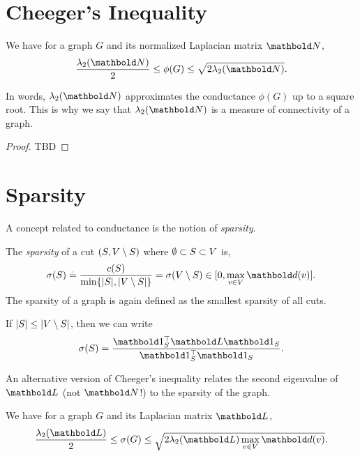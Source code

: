 \section{Cheeger's Inequality}

\begin{thm} We have for a graph $G$ and its normalized Laplacian matrix $\mN$, \begin{align}
    \frac{\lambda_2(\mN)}{2} \leq \phi(G) \leq \sqrt{2 \lambda_2(\mN)}.
\end{align}
\end{thm}\noindent In words, $\lambda_2(\mN)$ approximates the conductance $\phi(G)$ up to a square root. This is why we say that $\lambda_2(\mN)$ is a measure of connectivity of a graph.

\begin{proof}
TBD
\end{proof}

\section{Sparsity}

A concept related to conductance is the notion of \emph{sparsity}.

\begin{defn}[Sparsity] The \emph{sparsity} of a cut $(S, V \setminus S)$ where $\emptyset \subset S \subset V$ is, \begin{align}
    \sigma(\sS) \defeq \frac{c(\sS)}{\min\{|\sS|, |\sV \setminus \sS|\}} = \sigma(\sV \setminus \sS) \in [0, \max_{v \in \sV} \vd(v)].
\end{align} The sparsity of a graph is again defined as the smallest sparsity of all cuts.
\end{defn} If $|S| \leq |V \setminus S|$, then we can write \begin{align}
    \sigma(\sS) = \frac{\trans{\vOne_\sS}\mL\vOne_\sS}{\trans{\vOne_\sS}\vOne_\sS}.
\end{align}

An alternative version of Cheeger's inequality relates the second eigenvalue of $\mL$ (not $\mN$!) to the sparsity of the graph.

\begin{thm} We have for a graph $G$ and its Laplacian matrix $\mL$, \begin{align}
    \frac{\lambda_2(\mL)}{2} \leq \sigma(G) \leq \sqrt{2 \lambda_2(\mL) \max_{v \in \sV} \vd(v)}.
\end{align}
\end{thm}